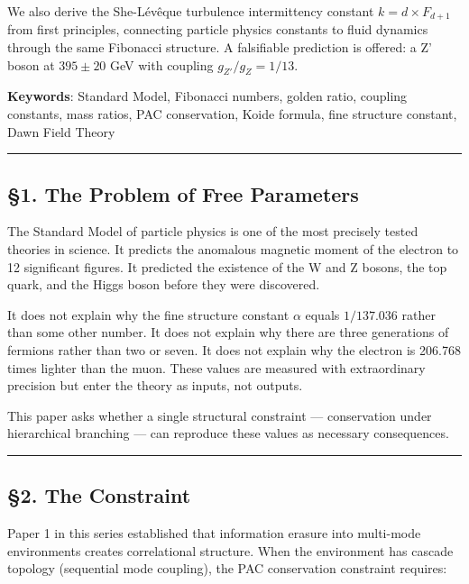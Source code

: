 \documentclass[
  11pt,
  a4paper]{article}
\begin{document}
We also derive the She-Lévêque turbulence intermittency constant
\(k = d \times F_{d+1}\) from first principles, connecting particle
physics constants to fluid dynamics through the same Fibonacci
structure. A falsifiable prediction is offered: a Z' boson at
\(395 \pm 20\) GeV with coupling \(g_{Z'}/g_Z = 1/13\).

\textbf{Keywords}: Standard Model, Fibonacci numbers, golden ratio,
coupling constants, mass ratios, PAC conservation, Koide formula, fine
structure constant, Dawn Field Theory

\begin{center}\rule{0.5\linewidth}{0.5pt}\end{center}

\subsection{§1. The Problem of Free
Parameters}\label{the-problem-of-free-parameters}

The Standard Model of particle physics is one of the most precisely
tested theories in science. It predicts the anomalous magnetic moment of
the electron to 12 significant figures. It predicted the existence of
the W and Z bosons, the top quark, and the Higgs boson before they were
discovered.

It does not explain why the fine structure constant \(\alpha\) equals
\(1/137.036\) rather than some other number. It does not explain why
there are three generations of fermions rather than two or seven. It
does not explain why the electron is 206.768 times lighter than the
muon. These values are measured with extraordinary precision but enter
the theory as inputs, not outputs.

This paper asks whether a single structural constraint --- conservation
under hierarchical branching --- can reproduce these values as necessary
consequences.

\begin{center}\rule{0.5\linewidth}{0.5pt}\end{center}

\subsection{§2. The Constraint}\label{the-constraint}

Paper 1 in this series established that information erasure into
multi-mode environments creates correlational structure. When the
environment has cascade topology (sequential mode coupling), the PAC
conservation constraint requires:
\end{document}
